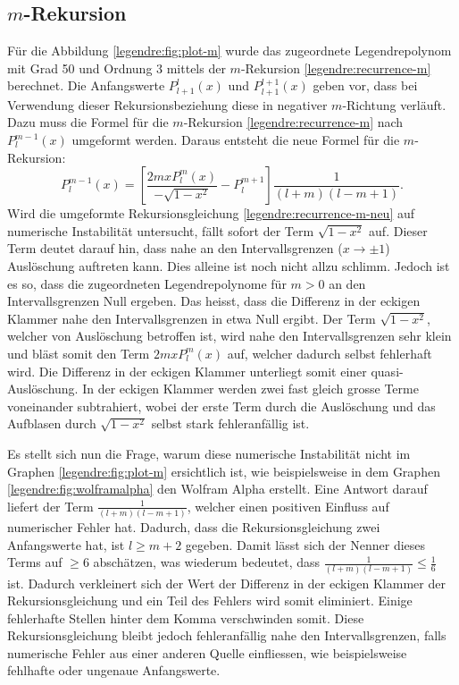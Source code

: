 \subsection{$m$-Rekursion
\label{legendre:subsection:mrichtung}}
Für die Abbildung \ref{legendre:fig:plot-m} wurde das zugeordnete Legendrepolynom mit Grad 50 und Ordnung 3 mittels der $m$-Rekursion \eqref{legendre:recurrence-m} berechnet.
Die Anfangswerte $P^{l}_{l+1}(x)$ und $P^{l+1}_{l+1}(x)$ geben vor, dass bei Verwendung dieser Rekursionsbeziehung diese in negativer $m$-Richtung verläuft.
Dazu muss die Formel für die $m$-Rekursion \eqref{legendre:recurrence-m} nach $P^{m-1}_{l}(x)$ umgeformt werden.
Daraus entsteht die neue Formel für die $m$-Rekursion:  
\begin{equation}
P^{m-1}_{l}(x)
= \left[ \frac{2mxP^{m}_{l}(x)}{- \sqrt{1-x^2}}-P^{m+1}_{l} \right]
\frac{1}{(l+m)(l-m+1)} .
\label{legendre:recurrence-m-neu}
\end{equation}
Wird die umgeformte Rekursionsgleichung \eqref{legendre:recurrence-m-neu} auf numerische Instabilität untersucht, fällt sofort der Term $\sqrt{1-x^2}$ auf.
Dieser Term deutet darauf hin, dass nahe an den Intervallsgrenzen ($x \rightarrow \pm 1$) Auslöschung auftreten kann.
Dies alleine ist noch nicht allzu schlimm.
Jedoch ist es so, dass die zugeordneten Legendrepolynome für $m>0$ an den Intervallsgrenzen Null ergeben.
Das heisst, dass die Differenz in der eckigen Klammer nahe den Intervallsgrenzen in etwa Null ergibt.
Der Term $\sqrt{1-x^2}$, welcher von Auslöschung betroffen ist, wird nahe den Intervallsgrenzen sehr klein und bläst somit den Term $2mxP^{m}_{l}(x)$ auf, welcher dadurch selbst fehlerhaft wird.
Die Differenz in der eckigen Klammer unterliegt somit einer quasi-Auslöschung.
In der eckigen Klammer werden zwei fast gleich grosse Terme voneinander subtrahiert, wobei der erste Term durch die Auslöschung und das Aufblasen durch $\sqrt{1-x^2}$ selbst stark fehleranfällig ist.

Es stellt sich nun die Frage, warum diese numerische Instabilität nicht im Graphen \ref{legendre:fig:plot-m} ersichtlich ist, wie beispielsweise in dem Graphen \ref{legendre:fig:wolframalpha} den Wolfram Alpha erstellt.
Eine Antwort darauf liefert der Term $\frac{1}{(l+m)(l-m+1)}$, welcher einen positiven Einfluss auf numerischer Fehler hat.
Dadurch, dass die Rekursionsgleichung zwei Anfangswerte hat, ist $l\geq m+2$ gegeben.
Damit lässt sich der Nenner dieses Terms auf $\geq 6$ abschätzen, was wiederum bedeutet, dass $\frac{1}{(l+m)(l-m+1)} \leq \frac{1}{6}$ ist.
Dadurch verkleinert sich der Wert der Differenz in der eckigen Klammer der Rekursionsgleichung und ein Teil des Fehlers wird somit eliminiert.
Einige fehlerhafte Stellen hinter dem Komma verschwinden somit.
Diese Rekursionsgleichung bleibt jedoch fehleranfällig nahe den Intervallsgrenzen, falls numerische Fehler aus einer anderen Quelle einfliessen, wie beispielsweise fehlhafte oder ungenaue Anfangswerte.

